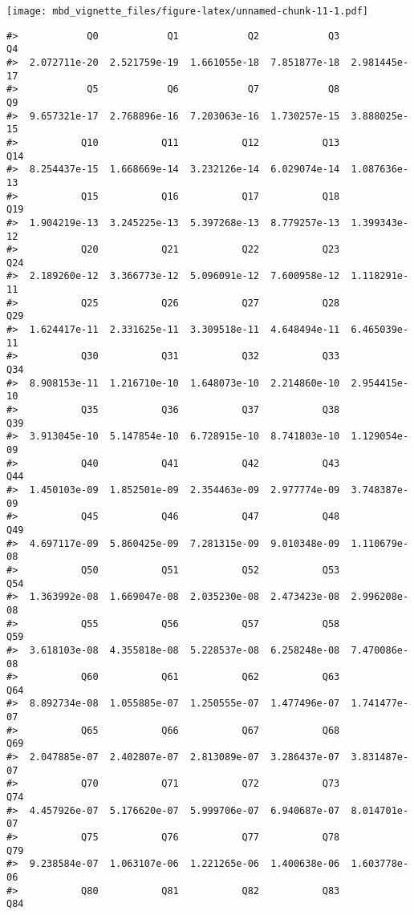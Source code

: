 \documentclass[]{article}
\begin{document}
\texttt{[image: mbd\_vignette\_files/figure-latex/unnamed-chunk-11-1.pdf]}

\begin{verbatim}
#>            Q0            Q1            Q2            Q3            Q4 
#>  2.072711e-20  2.521759e-19  1.661055e-18  7.851877e-18  2.981445e-17 
#>            Q5            Q6            Q7            Q8            Q9 
#>  9.657321e-17  2.768896e-16  7.203063e-16  1.730257e-15  3.888025e-15 
#>           Q10           Q11           Q12           Q13           Q14 
#>  8.254437e-15  1.668669e-14  3.232126e-14  6.029074e-14  1.087636e-13 
#>           Q15           Q16           Q17           Q18           Q19 
#>  1.904219e-13  3.245225e-13  5.397268e-13  8.779257e-13  1.399343e-12 
#>           Q20           Q21           Q22           Q23           Q24 
#>  2.189260e-12  3.366773e-12  5.096091e-12  7.600958e-12  1.118291e-11 
#>           Q25           Q26           Q27           Q28           Q29 
#>  1.624417e-11  2.331625e-11  3.309518e-11  4.648494e-11  6.465039e-11 
#>           Q30           Q31           Q32           Q33           Q34 
#>  8.908153e-11  1.216710e-10  1.648073e-10  2.214860e-10  2.954415e-10 
#>           Q35           Q36           Q37           Q38           Q39 
#>  3.913045e-10  5.147854e-10  6.728915e-10  8.741803e-10  1.129054e-09 
#>           Q40           Q41           Q42           Q43           Q44 
#>  1.450103e-09  1.852501e-09  2.354463e-09  2.977774e-09  3.748387e-09 
#>           Q45           Q46           Q47           Q48           Q49 
#>  4.697117e-09  5.860425e-09  7.281315e-09  9.010348e-09  1.110679e-08 
#>           Q50           Q51           Q52           Q53           Q54 
#>  1.363992e-08  1.669047e-08  2.035230e-08  2.473423e-08  2.996208e-08 
#>           Q55           Q56           Q57           Q58           Q59 
#>  3.618103e-08  4.355818e-08  5.228537e-08  6.258248e-08  7.470086e-08 
#>           Q60           Q61           Q62           Q63           Q64 
#>  8.892734e-08  1.055885e-07  1.250555e-07  1.477496e-07  1.741477e-07 
#>           Q65           Q66           Q67           Q68           Q69 
#>  2.047885e-07  2.402807e-07  2.813089e-07  3.286437e-07  3.831487e-07 
#>           Q70           Q71           Q72           Q73           Q74 
#>  4.457926e-07  5.176620e-07  5.999706e-07  6.940687e-07  8.014701e-07 
#>           Q75           Q76           Q77           Q78           Q79 
#>  9.238584e-07  1.063107e-06  1.221265e-06  1.400638e-06  1.603778e-06 
#>           Q80           Q81           Q82           Q83           Q84 

\end{verbatim}
\end{document}
